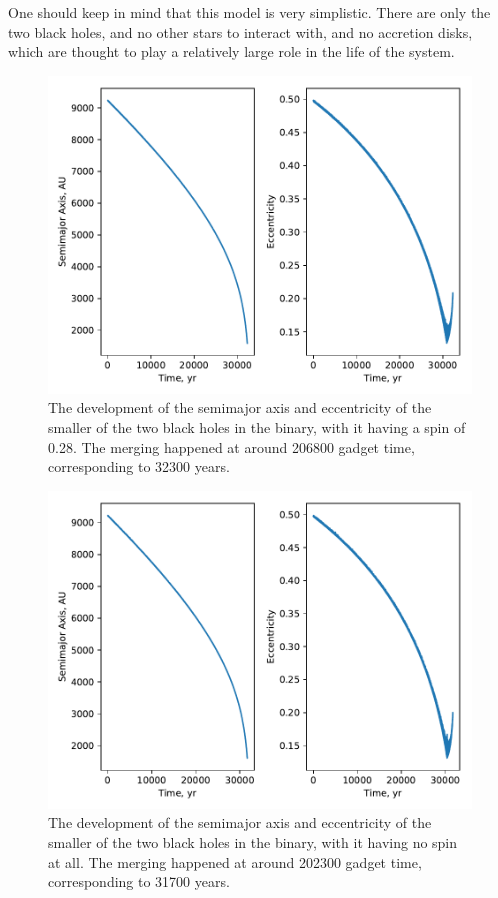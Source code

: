 \documentclass[english, oneside]{HYgradu}
\begin{document}
One should keep in mind that this model is very simplistic. There are only the two black holes, and no other stars to interact with, and no accretion disks, which are thought to play a relatively large role in the life of the system.

\begin{figure}[h!tb]
\centering
\includegraphics[width=\textwidth]{../images/spinNormal.pdf}
\caption{The development of the semimajor axis and eccentricity of the smaller of the two black holes in the binary, with it having a spin of 0.28. The merging happened at around 206800 gadget time, corresponding to 32300 years.}
\label{fig:spinNormal}
\end{figure}

\begin{figure}[h!tb]
\centering
\includegraphics[width=\textwidth]{../images/spin0.pdf}
\caption{The development of the semimajor axis and eccentricity of the smaller of the two black holes in the binary, with it having no spin at all. The merging happened at around 202300 gadget time, corresponding to 31700 years.}
\label{fig:spin0}
\end{figure}
\end{document}
